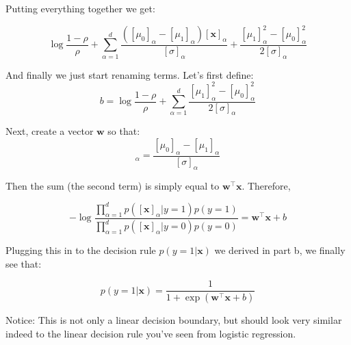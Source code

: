 \documentclass[a4paper]{article}
\begin{document}
Putting everything together we get:

\begin{equation*}
\log \frac{1-\rho}{\rho} + \sum_{\alpha=1}^{d} \frac{([\mu_{0}]_{\alpha}-[\mu_{1}]_{\alpha})[\textbf{x}]_{\alpha}}{[\sigma]_{\alpha}} + \frac{[\mu_{1}]^{2}_{\alpha}-[\mu_{0}]^{2}_{\alpha}}{2[\sigma]_{\alpha}}
\end{equation*}

And finally we just start renaming terms. Let's first define:
\begin{equation*}
b = \log \frac{1-\rho}{\rho} + \sum_{\alpha=1}^{d} \frac{[\mu_{1}]^{2}_{\alpha}-[\mu_{0}]^{2}_{\alpha}}{2[\sigma]_{\alpha}}
\end{equation*}

Next, create a vector $\mathbf{w}$ so that:
\begin{equation*}
[\mathbf{w}]_{\alpha} = \frac{[\mu_{0}]_{\alpha}-[\mu_{1}]_{\alpha}}{[\sigma]_{\alpha}}
\end{equation*}

Then the sum (the second term) is simply equal to $\mathbf{w}^{\top}\textbf{x}$. Therefore,

\begin{equation*}
-\log\frac{\prod_{\alpha=1}^{d} p([\textbf{x}]_{\alpha}|y=1)p(y=1)}{\prod_{\alpha=1}^{d} p([\textbf{x}]_{\alpha}|y=0)p(y=0)} = \mathbf{w}^{\top}\textbf{x}+b
\end{equation*}

Plugging this in to the decision rule $p(y=1|\textbf{x})$ we derived in part b, we finally see that:

\begin{equation*}
	p(y=1|\textbf{x}) = \frac{1}{1+\exp\left(\mathbf{w}^{\top}\textbf{x}+b\right)}
\end{equation*}

Notice: This is not only a linear decision boundary, but should look very similar indeed to the linear decision rule you've seen from logistic regression.
\end{document}
